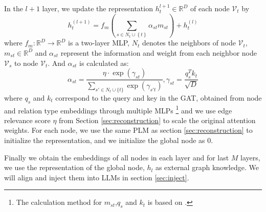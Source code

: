 \documentclass[11pt]{article}
\begin{document}
In the $l+1$ layer, we update the representation $h_t^{l+1} \in \mathbb{R}^{D}$ of each node $\mathcal{V}_{t} $ by 
\begin{equation}
    h_{t}^{\left( l+1 \right)}=f_m\left( \sum_{s\in N_t\cup \left\{ t \right\}}{\alpha _{st}m_{st}} \right) +h_{t}^{\left( l \right)}
\end{equation}
where $f_m: \mathbb{R}^D \rightarrow \mathbb{R}^D$ is a two-layer MLP, $N_t$ denotes the neighbors of node $\mathcal{V}_{t}$, $m_{st} \in \mathbb{R}^D$ and $\alpha_{st}$ represent the information and weight from each neighbor node $\mathcal{V}_{s}$ to node $\mathcal{V}_{t}$. And $\alpha_{st}$ is calculated as: 
\begin{equation}
    \alpha_{st} = \frac{\eta \cdot \exp(\gamma_{st})}{\sum_{s' \in N_t \cup \{t\}} \exp(\gamma_{s't})},\gamma_{st} = \frac{q_{s}^{T}k_t}{\sqrt{D}}
\end{equation}
where $q_s$ and $k_t$ correspond to the query and key in the GAT, obtained from node and relation type embeddings through multiple MLPs \footnote{The calculation method for $m_{st}$,$q_s $ and $k_t$ is based on \citealt{qagnn}.} and we use edge relevance score \(\eta\) from Section \ref{sec:reconstruction} to scale the original attention weights. For each node, we use the same PLM as section \ref{sec:reconstruction} to initialize the representation, and we initialize the global node as 0. 

Finally we obtain the embeddings of all nodes in each layer and for last $M$ layers, we use the representation of the global node, $h_l$ as external graph knowledge. 
We will align and inject them into LLMs in section \ref{sec:inject}. 
\end{document}
